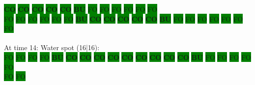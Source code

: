 \colorbox{green}{\color[rgb]{0,0,0}\textbf{CO}}%
\colorbox{green}{\color[rgb]{0,0,0}\textbf{CO}}%
\colorbox{green}{\color[rgb]{0,0,0}\textbf{CO}}%
\colorbox{green}{\color[rgb]{0,0,0}\textbf{CO}}%
\colorbox{green}{\color[rgb]{0,0,0}\textbf{CO}}%
\colorbox{green}{\color[rgb]{1,0,0}\textbf{BU}}%
\colorbox{green}{\color[gray]{0.75}FO}%
\colorbox{green}{\color[gray]{0.75}FO}%
\colorbox{green}{\color[gray]{0.75}FO}%
\colorbox{green}{\color[gray]{0.75}FO}%
\colorbox{green}{\color[gray]{0.75}FO}%
\colorbox{green}{\color[gray]{0.75}FO}%
\\
\colorbox{green}{\color[gray]{0.75}FO}%
\colorbox{green}{\color[gray]{0.75}FO}%
\colorbox{green}{\color[gray]{0.75}FO}%
\colorbox{green}{\color[gray]{0.75}FO}%
\colorbox{green}{\color[gray]{0.75}FO}%
\colorbox{green}{\color[gray]{0.75}FO}%
\colorbox{green}{\color[rgb]{1,0,0}\textbf{BU}}%
\colorbox{green}{\color[rgb]{0,0,0}\textbf{CO}}%
\colorbox{green}{\color[rgb]{0,0,0}\textbf{CO}}%
\colorbox{green}{\color[rgb]{0,0,0}\textbf{CO}}%
\colorbox{green}{\color[rgb]{0,0,0}\textbf{CO}}%
\colorbox{green}{\color[rgb]{0,0,0}\textbf{CO}}%
\colorbox{green}{\color[rgb]{1,0,0}\textbf{BU}}%
\colorbox{green}{\color[gray]{0.75}FO}%
\colorbox{green}{\color[gray]{0.75}FO}%
\colorbox{green}{\color[gray]{0.75}FO}%
\colorbox{green}{\color[gray]{0.75}FO}%
\colorbox{green}{\color[gray]{0.75}FO}%
\colorbox{green}{\color[gray]{0.75}FO}%
\colorbox{green}{\color[gray]{0.75}FO}%
\\
\\
At time 14: Water spot (16|16):
\\
\colorbox{green}{\color[gray]{0.75}FO}%
\colorbox{green}{\color[gray]{0.75}FO}%
\colorbox{green}{\color[gray]{0.75}FO}%
\colorbox{green}{\color[gray]{0.75}FO}%
\colorbox{green}{\color[rgb]{1,0,0}\textbf{BU}}%
\colorbox{green}{\color[rgb]{0,0,0}\textbf{CO}}%
\colorbox{green}{\color[rgb]{0,0,0}\textbf{CO}}%
\colorbox{green}{\color[rgb]{0,0,0}\textbf{CO}}%
\colorbox{green}{\color[rgb]{0,0,0}\textbf{CO}}%
\colorbox{green}{\color[rgb]{0,0,0}\textbf{CO}}%
\colorbox{green}{\color[rgb]{0,0,0}\textbf{CO}}%
\colorbox{green}{\color[rgb]{0,0,0}\textbf{CO}}%
\colorbox{green}{\color[rgb]{0,0,0}\textbf{CO}}%
\colorbox{green}{\color[rgb]{0,0,0}\textbf{CO}}%
\colorbox{green}{\color[rgb]{1,0,0}\textbf{BU}}%
\colorbox{green}{\color[gray]{0.75}FO}%
\colorbox{green}{\color[gray]{0.75}FO}%
\colorbox{green}{\color[gray]{0.75}FO}%
\colorbox{green}{\color[gray]{0.75}FO}%
\colorbox{green}{\color[gray]{0.75}FO}%
\\
\colorbox{green}{\color[gray]{0.75}FO}%
\colorbox{green}{\color[gray]{0.75}FO}%

